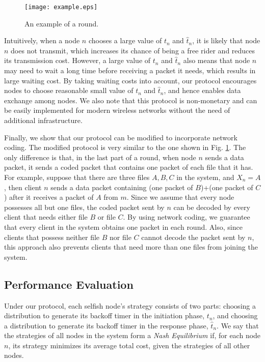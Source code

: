 \documentclass[11pt, conference]{IEEEtran}
\begin{document}
\begin{figure}[t]
\texttt{[image: example.eps]}
\caption{An example of a round.} \label{fig:model:example}
\end{figure}

Intuitively, when a node $n$ chooses a large value of $t_n$ and $\hat{t}_n$, it is likely that node $n$ does not transmit, which increases its chance of being a free rider and reduces its transmission cost. However, a large value of $t_n$ and $\hat{t}_n$ also means that node $n$ may need to wait a long time before receiving a packet it needs, which results in large waiting cost. By taking waiting costs into account, our protocol encourages nodes to choose reasonable small value of $t_n$ and $\hat{t}_n$, and hence enables data exchange among nodes. We also note that this protocol is non-monetary and can be easily implemented for modern wireless networks without the need of additional infrastructure.

Finally, we show that our protocol can be modified to incorporate network coding. The modified protocol is very similar to the one shown in Fig. \ref{fig:model:example}. The only difference is that, in the last part of a round, when node $n$ sends a data packet, it sends a coded packet that contains one packet of each file that it has. For example, suppose that there are three files $A,B,C$ in the system, and $X_n=A$, then client $n$ sends a data packet containing (one packet of $B$)+(one packet of $C$) after it receives a packet of $A$ from $m$. Since we assume that every node possesses all but one files, the coded packet sent by $n$ can be decoded by every client that needs either file $B$ or file $C$. By using network coding, we guarantee that every client in the system obtains one packet in each round. Also, since clients that possess neither file $B$ nor file $C$ cannot decode the packet sent by $n$, this approach also prevents clients that need more than one files from joining the system. 

\subsection{Performance Evaluation}

Under our protocol, each selfish node's strategy consists of two parts: choosing a distribution to generate its backoff timer in the initiation phase, $t_n$, and choosing a distribution to generate its backoff timer in the response phase, $\hat{t}_n$. We say that the strategies of all nodes in the system form a \emph{Nash Equilibrium} if, for each node $n$, its strategy minimizes its average total cost, given the strategies of all other nodes.
\end{document}
